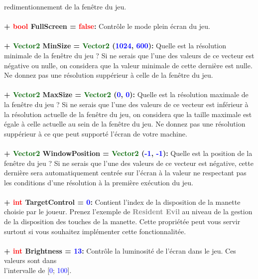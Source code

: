 \documentclass[a4paper, 11pt]{article}
\begin{document}
	redimentionnement de la fenêtre du jeu.\\\\
	\textbf{+ \textcolor{red}{bool} FullScreen = \textcolor{red}{false}:} Contrôle le mode plein écran du 
	jeu.\\\\
	\textbf{+ \textcolor{darkgreen}{Vector2} MinSize = \textcolor{darkgreen}{Vector2} (\textcolor{blue}
	{1024}, \textcolor{blue}{600}):} Quelle est la résolution minimale de la fenêtre du jeu ? Si ne serais
	que l'une des valeurs de ce vecteur est négative ou nulle, on considera que la valeur minimale de cette 
	dernière est nulle. Ne donnez pas une résolution suppérieur à celle de la fenêtre du jeu.\\\\
	\textbf{+ \textcolor{darkgreen}{Vector2} MaxSize = \textcolor{darkgreen}{Vector2} (\textcolor{blue}
	{0}, \textcolor{blue}{0}):} Quelle est la résolution maximale de la fenêtre du jeu ? Si ne serais que 
	l'une des valeurs de ce vecteur est inférieur à la résolution actuelle de la fenêtre du jeu, on 
	considera que la taille maximale est égale à celle actuelle au sein de la fenêtre du jeu. Ne donnez pas 
	une résolution suppérieur à ce que peut supporté l'écran de votre machine.\\\\
	\textbf{+ \textcolor{darkgreen}{Vector2} WindowPosition = \textcolor{darkgreen}{Vector2}
	(\textcolor{blue}{-1}, \textcolor{blue}{-1}):} Quelle est la position de la fenêtre du jeu ? Si ne 
	serais que l'une des valeurs de ce vecteur est négative, cette dernière sera automatiquement centrée 
	sur l'écran à la valeur ne respectant pas les conditions d'une résolution à la première exécution du 
	jeu.\\\\
	\textbf{+ \textcolor{red}{int} TargetControl = \textcolor{blue}{0}:} Contient l'index de la disposition 
	de la manette choisie par le joueur. Prenez l'exemple de \textbf{\textcolor{gray}{Resident Evil}} au 
	niveau de la gestion de la disposition des touches de la manette. Cette propriétée peut vous servir 
	surtout si vous souhaitez implémenter cette fonctionnalitée.\\\\
	\textbf{+ \textcolor{red}{int} Brightness = \textcolor{blue}{13}:} Contrôle la luminosité de l'écran 
	dans le jeu. Ces valeurs sont dans \\l'intervalle de [\textcolor{blue}{0}; \textcolor{blue}{100}].\\\\
\end{document}
